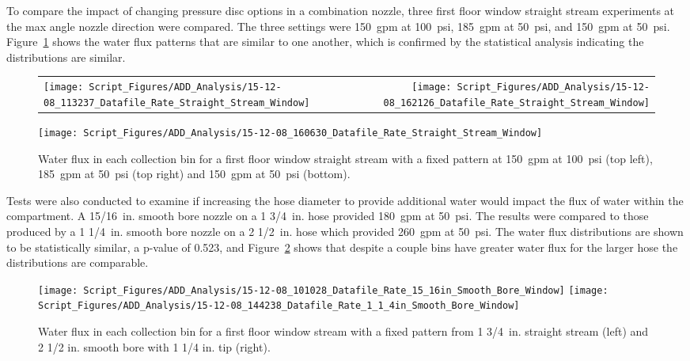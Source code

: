 \documentclass[12pt,oneside]{book}
\begin{document}
To compare the impact of changing pressure disc options in a combination nozzle, three first floor window straight stream experiments at the max angle nozzle direction were compared. The three settings were 150~gpm at 100~psi, 185~gpm at 50~psi, and 150~gpm at 50~psi. Figure~\ref{fig:Window_First_Floor_Varying_Nozzle_Pressure_SS_Fixed_Pattern} shows the water flux patterns that are similar to one another, which is confirmed by the statistical analysis indicating the distributions are similar.   

\begin{figure}[ht]
\begin{tabular*}{\textwidth}{lr}
\texttt{[image: Script\_Figures/ADD\_Analysis/15-12-08\_113237\_Datafile\_Rate\_Straight\_Stream\_Window]} & 
\texttt{[image: Script\_Figures/ADD\_Analysis/15-12-08\_162126\_Datafile\_Rate\_Straight\_Stream\_Window]} \\
\end{tabular*}
\centering
\texttt{[image: Script\_Figures/ADD\_Analysis/15-12-08\_160630\_Datafile\_Rate\_Straight\_Stream\_Window]}  
\caption[Water Flux Varying Pressure Discs in Combination Nozzle]{Water flux in each collection bin for a first floor window straight stream with a fixed pattern at 150~gpm at 100~psi (top left), 185~gpm at 50~psi (top right) and 150~gpm at 50~psi (bottom).}
\label{fig:Window_First_Floor_Varying_Nozzle_Pressure_SS_Fixed_Pattern}
\end{figure}

\clearpage

Tests were also conducted to examine if increasing the hose diameter to provide additional water would impact the flux of water within the compartment. A 15/16~in. smooth bore nozzle on a 1 3/4~in. hose provided 180~gpm at 50~psi. The results were compared to those produced by a 1 1/4~in. smooth bore nozzle on a 2 1/2~in. hose which provided 260~gpm at 50~psi. The water flux distributions are shown to be statistically similar, a p-value of 0.523, and Figure~\ref{fig:Window_First_Floor_Varying_Hose_Size} shows that despite a couple bins have greater water flux for the larger hose the distributions are comparable.

\begin{figure}[ht]
\texttt{[image: Script\_Figures/ADD\_Analysis/15-12-08\_101028\_Datafile\_Rate\_15\_16in\_Smooth\_Bore\_Window]}
\texttt{[image: Script\_Figures/ADD\_Analysis/15-12-08\_144238\_Datafile\_Rate\_1\_1\_4in\_Smooth\_Bore\_Window]} \\ 
\caption[Water Flux Varying Hose Size]{Water flux in each collection bin for a first floor window stream with a fixed pattern from 1 3/4~in. straight stream (left) and 2 1/2 in. smooth bore with 1 1/4 in. tip (right).}
\label{fig:Window_First_Floor_Varying_Hose_Size}
\end{figure}
\end{document}
